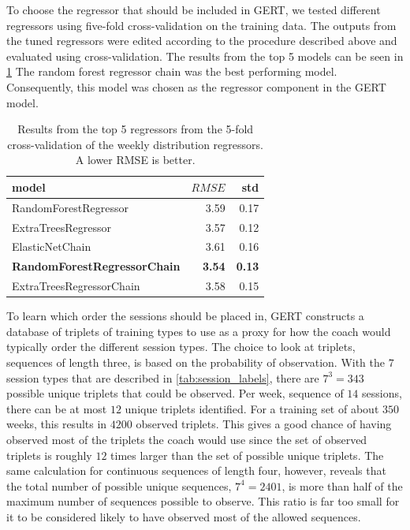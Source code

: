 To choose the regressor that should be included in GERT, we tested different regressors using five-fold cross-validation on the training data.
The outputs from the tuned regressors were edited according to the procedure described above and evaluated using cross-validation.
The results from the top 5 models can be seen in \cref{tab:weekly_cv_results}
The random forest regressor chain was the best performing model.
Consequently, this model was chosen as the regressor component in the GERT model.

\begin{table}
    \centering
    \begin{tabularx}{0.7\textwidth}{lrr}
    \toprule
                          model & $RMSE$ &  std \\
    \midrule
          RandomForestRegressor &  3.59 &  0.17 \\
             ExtraTreesRegressor &  3.57 &  0.12 \\
                 ElasticNetChain &  3.61 &  0.16 \\
      \textbf{RandomForestRegressorChain} &  \textbf{3.54}&  \textbf{0.13} \\
        ExtraTreesRegressorChain &  3.58 &  0.15 \\
    \bottomrule
    \end{tabularx}
    \caption{Results from the top 5 regressors from the 5-fold cross-validation of the weekly distribution regressors. A lower RMSE is better.}
    \label{tab:weekly_cv_results}
\end{table}

To learn which order the sessions should be placed in, GERT constructs a database of triplets of training types to use as a proxy for how the coach would typically order the different session types.
The choice to look at triplets, sequences of length three, is based on the probability of observation. 
With the $7$ session types that are described in \cref{tab:session_labels}, there are $7^3=343$ possible unique triplets that could be observed.
Per week, sequence of $14$ sessions, there can be at most $12$ unique triplets identified.
For a training set of about $350$ weeks, this results in $4200$ observed triplets.
This gives a good chance of having observed most of the triplets the coach would use since the set of observed triplets is roughly $12$ times larger than the set of possible unique triplets.
The same calculation for continuous sequences of length four, however, reveals that the total number of possible unique sequences, $7^4=2401$, is more than half of the maximum number of sequences possible to observe.
This ratio is far too small for it to be considered likely to have observed most of the allowed sequences.



